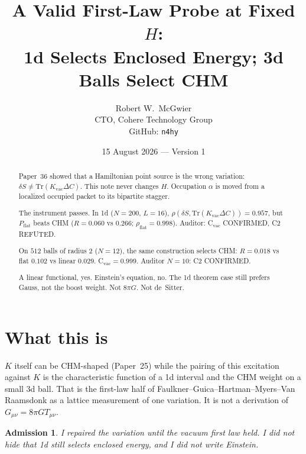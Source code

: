 \documentclass[11pt]{article}
\title{\textbf{A Valid First-Law Probe at Fixed $H$:\\
1d Selects Enclosed Energy; 3d Balls Select CHM}}
\author{Robert W.\ McGwier\\
\small CTO, Cohere Technology Group\\
\small GitHub: \texttt{n4hy}}
\date{15 August 2026 --- Version 1}
\newtheorem*{admission}{Admission}
\begin{document}
\maketitle

\begin{abstract}
\noindent
Paper~36 showed that a Hamiltonian point source is the wrong
variation: $\delta S\neq\mathrm{Tr}(K_{\mathrm{vac}}\Delta C)$.
This note never changes $H$. Occupation $\alpha$ is moved from
a localized occupied packet to its bipartite stagger.

The instrument passes. In 1d ($N=200$, $L=16$),
$\rho(\delta S,\mathrm{Tr}(K_{\mathrm{vac}}\Delta C))=0.957$,
but $P_{\mathrm{flat}}$ beats CHM ($R=0.060$ vs $0.266$;
$\rho_{\mathrm{flat}}=0.998$). Auditor: C$_{\mathrm{vac}}$
CONFIRMED, C2 REFUTED.

On $512$ balls of radius $2$ ($N=12$), the same construction
selects CHM: $R=0.018$ vs flat $0.102$ vs linear $0.029$.
C$_{\mathrm{vac}}=0.999$. Auditor $N=10$: C2 CONFIRMED.

A linear functional, yes. Einstein's equation, no.
The 1d theorem case still prefers Gauss, not the boost
weight. Not $8\pi G$. Not de~Sitter.
\end{abstract}

\section{What this is}

$K$ itself can be CHM-shaped (Paper~25) while the pairing of
this excitation against $K$ is the characteristic function of
a 1d interval and the CHM weight on a small 3d ball. That is
the first-law half of Faulkner--Guica--Hartman--Myers--Van
Raamsdonk as a lattice measurement of one variation. It is
not a derivation of $G_{\mu\nu}=8\pi GT_{\mu\nu}$.

\begin{admission}
I repaired the variation until the vacuum first law held. I
did not hide that 1d still selects enclosed energy, and I did
not write Einstein.
\end{admission}
\end{document}
